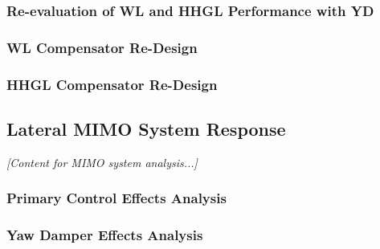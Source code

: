 \subsubsection{Re-evaluation of WL and HHGL Performance with YD}

\subsubsection{WL Compensator Re-Design}

\subsubsection{HHGL Compensator Re-Design}

\subsection{Lateral MIMO System Response}

\textit{[Content for MIMO system analysis...]}

\subsubsection{Primary Control Effects Analysis}

\subsubsection{Yaw Damper Effects Analysis}
